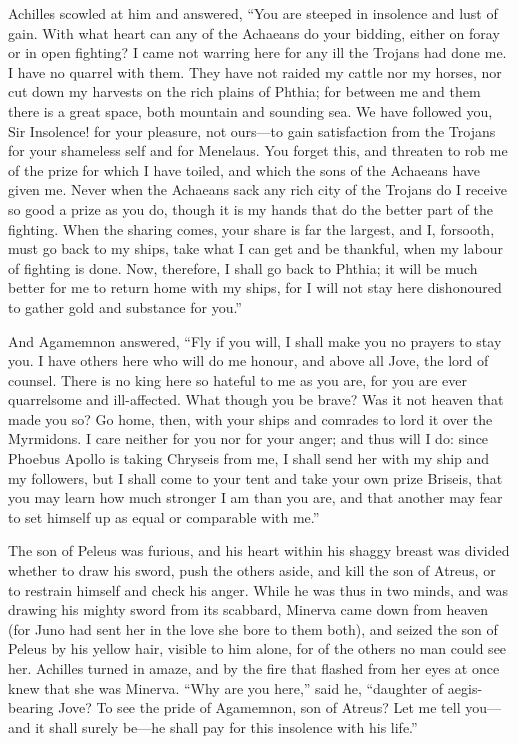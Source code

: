 Achilles scowled at him and answered, “You are steeped in insolence and
lust of gain. With what heart can any of the Achaeans do your bidding,
either on foray or in open fighting? I came not warring here for any ill
the Trojans had done me. I have no quarrel with them. They have not raided
my cattle nor my horses, nor cut down my harvests on the rich plains of
Phthia; for between me and them there is a great space, both mountain and
sounding sea. We have followed you, Sir Insolence! for your pleasure, not
ours—to gain satisfaction from the Trojans for your shameless self
and for Menelaus. You forget this, and threaten to rob me of the prize for
which I have toiled, and which the sons of the Achaeans have given me.
Never when the Achaeans sack any rich city of the Trojans do I receive so
good a prize as you do, though it is my hands that do the better part of
the fighting. When the sharing comes, your share is far the largest, and
I, forsooth, must go back to my ships, take what I can get and be
thankful, when my labour of fighting is done. Now, therefore, I shall go
back to Phthia; it will be much better for me to return home with my
ships, for I will not stay here dishonoured to gather gold and substance
for you.”

And Agamemnon answered, “Fly if you will, I shall make you no prayers to
stay you. I have others here who will do me honour, and above all Jove,
the lord of counsel. There is no king here so hateful to me as you are,
for you are ever quarrelsome and ill-affected. What though you be brave?
Was it not heaven that made you so? Go home, then, with your ships and
comrades to lord it over the Myrmidons. I care neither for you nor for
your anger; and thus will I do: since Phoebus Apollo is taking Chryseis
from me, I shall send her with my ship and my followers, but I shall come
to your tent and take your own prize Briseis, that you may learn how much
stronger I am than you are, and that another may fear to set himself up as
equal or comparable with me.”

The son of Peleus was furious, and his heart within his shaggy breast was
divided whether to draw his sword, push the others aside, and kill the son
of Atreus, or to restrain himself and check his anger. While he was thus
in two minds, and was drawing his mighty sword from its scabbard, Minerva
came down from heaven (for Juno had sent her in the love she bore to them
both), and seized the son of Peleus by his yellow hair, visible to him
alone, for of the others no man could see her. Achilles turned in amaze,
and by the fire that flashed from her eyes at once knew that she was
Minerva. “Why are you here,” said he, “daughter of aegis-bearing Jove? To
see the pride of Agamemnon, son of Atreus? Let me tell you—and it
shall surely be—he shall pay for this insolence with his life.”

